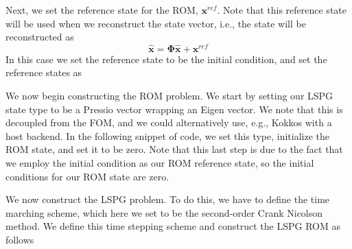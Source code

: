 Next, we set the reference state for the R\+OM, $\boldsymbol x^{ref}$. Note that this reference state will be used when we reconstruct the state vector, i.\+e., the state will be reconstructed as \[\hat{ \boldsymbol x} = \boldsymbol \Phi \hat{\boldsymbol x} + \boldsymbol x^{ref}\] In this case we set the reference state to be the initial condition, and set the reference states as 
\begin{DoxyCode}{0}
\DoxyCodeLine{\textcolor{comment}{// -\/-\/-\/-\/-\/-\/-\/-\/-\/-\/-\/-\/-\/-\/-\/-\/-\/-\/-\/-\/-\/-\/-\/-\/-\/-\/-\/-\/-\/-\/-\/-\/-\/-\/-\/-\/-\/-\/-\/-\/-\/-\/-\/-\/-\/-\/-\/-\/-\/-\/-\/-\/-\/-\/-\/}}
\DoxyCodeLine{\textcolor{comment}{// create reference state}}
\DoxyCodeLine{\textcolor{comment}{// -\/-\/-\/-\/-\/-\/-\/-\/-\/-\/-\/-\/-\/-\/-\/-\/-\/-\/-\/-\/-\/-\/-\/-\/-\/-\/-\/-\/-\/-\/-\/-\/-\/-\/-\/-\/-\/-\/-\/-\/-\/-\/-\/-\/-\/-\/-\/-\/-\/-\/-\/-\/-\/-\/-\/}}
\end{DoxyCode}


We now begin constructing the R\+OM problem. We start by setting our L\+S\+PG state type to be a Pressio vector wrapping an Eigen vector. We note that this is decoupled from the F\+OM, and we could alternatively use, e.\+g., Kokkos with a host backend. In the following snippet of code, we set this type, initialize the R\+OM state, and set it to be zero. Note that this last step is due to the fact that we employ the initial condition as our R\+OM reference state, so the initial conditions for our R\+OM state are zero. 
\begin{DoxyCode}{0}
\DoxyCodeLine{\textcolor{comment}{// -\/-\/-\/-\/-\/-\/-\/-\/-\/-\/-\/-\/-\/-\/-\/-\/-\/-\/-\/-\/-\/-\/-\/-\/-\/-\/-\/-\/-\/-\/-\/-\/-\/-\/-\/-\/-\/-\/-\/-\/-\/-\/-\/-\/-\/-\/-\/-\/-\/-\/-\/-\/-\/-\/-\/}}
\DoxyCodeLine{\textcolor{comment}{// create ROM problem}}
\DoxyCodeLine{\textcolor{comment}{// -\/-\/-\/-\/-\/-\/-\/-\/-\/-\/-\/-\/-\/-\/-\/-\/-\/-\/-\/-\/-\/-\/-\/-\/-\/-\/-\/-\/-\/-\/-\/-\/-\/-\/-\/-\/-\/-\/-\/-\/-\/-\/-\/-\/-\/-\/-\/-\/-\/-\/-\/-\/-\/-\/-\/}}
\DoxyCodeLine{\textcolor{comment}{// define ROM state}}
\DoxyCodeLine{\textcolor{comment}{// initialize to zero (reference state is IC)}}
\end{DoxyCode}


We now construct the L\+S\+PG problem. To do this, we have to define the time marching scheme, which here we set to be the second-\/order Crank Nicolson method. We define this time stepping scheme and construct the L\+S\+PG R\+OM as follows 
\begin{DoxyCode}{0}
\DoxyCodeLine{\textcolor{comment}{// define LSPG type}}
\end{DoxyCode}


